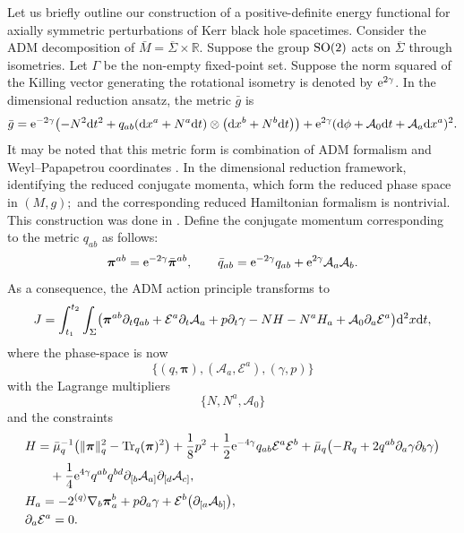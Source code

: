 \documentclass[11pt]{article}
\numberwithin{equation}{section}
\def\ptl{\partial}%
\def\mbo#1{\boldsymbol{#1}}%
\def\olin#1{\overline{#1}{}}%
\def\grad{{\nabla}}%
\newcommand{\leftexp}[2]{{\vphantom{#2}}^{#1}{#2}}
\def\halb{\frac{1}{2}}%
\numberwithin{equation}{section}
\begin{document}
Let us briefly outline our construction of a positive-definite energy functional for axially symmetric perturbations of Kerr black hole spacetimes. Consider the ADM decomposition of $\bar{M}=\olin{\Sigma} \times \mathbb{R}$. Suppose the group ${\rm SO}(2)$ acts on $\olin{\Sigma}$ through isometries. Let $\Gamma$ be the non-empty fixed-point set. Suppose the norm squared of the Killing vector generating the rotational isometry is denoted by ${\rm e}^{2\gamma}$. In the dimensional reduction ansatz, the metric $\bar{g}$ is
\begin{align}\label{KK-ADM}
\bar{g} = {\rm e}^{-2\gamma} \bigl(-N^2 {\rm d}t^2 + q_{ab} ({\rm d}x^a + N^a {\rm d}t) \otimes \bigl({\rm d}x^b + N^b {\rm d}t\bigr)\bigr) + {\rm e}^{2\gamma} ({\rm d}\phi + \mathcal{A}_0 {\rm d}t + \mathcal{A}_a {\rm d}x^a)^2.
\end{align}
It may be noted that this metric form is combination of ADM formalism and Weyl--Papapetrou coordinates \cite{Moncrief_74}.
In the dimensional reduction framework, identifying the reduced conjugate momenta, which form the reduced phase space in $(M, g);$ and the corresponding reduced Hamiltonian formalism is nontrivial. This construction was done in \cite{kaluz1}. Define the conjugate momentum corresponding to the metric $q_{ab}$ as follows:
\begin{align*}
\mbo{\pi}^{ab} = {\rm e}^{-2\gamma} \bar{\mbo{\pi}}^{ab}, \qquad \bar{q}_{ab} = {\rm e}^{-2\gamma} q_{ab} + {\rm e}^{2\gamma} \mathcal{A}_a \mathcal{A}_b.
\end{align*}
As a consequence, the ADM action principle transforms to
\begin{align*}
J = \int^{t_2}_{t_1}\int_{\Sigma} \bigl(\mbo{\pi}^{ab} \ptl_t q_{ab} + \mathcal{E}^a \ptl_t \mathcal{A}_a + p \ptl_t \gamma - N H - N^aH_a+ \mathcal{A}_0 \ptl_a \mathcal{E}^a \bigr) {\rm d}^2x{\rm d}t,
\end{align*}
where the phase-space is now
\[
 \{ (q, \mbo{\pi}), (\mathcal{A}_a, \mathcal{E}^a), (\gamma, p) \}
\]
with the Lagrange multipliers
\[
 \{ N, N^a, \mathcal{A}_0 \}
\]
and the constraints
\begin{subequations} \label{2+1constraints}
\begin{align}
&H= \bar{\mu}^{-1}_q \bigl(\Vert \mbo{\pi} \Vert^2_q - {\rm Tr}_q(\mbo{\pi})^2\bigr) + \frac{1}{8} p^2 + \halb {\rm e}^{-4\gamma}
q_{ab} \mathcal{E}^a \mathcal{E}^b + \bar{\mu}_q \bigl(-R_q + 2 q^{ab} \ptl_a \gamma \ptl_b \gamma\bigr) \notag\\
&\hphantom{H=}{}+ \frac{1}{4} {\rm e}^{4\gamma} q^{ab}q^{bd} \ptl_{[b} \mathcal{A}_{a]} \ptl_{[d} \mathcal{A}_{c]}, \\
&H_a= -2 \leftexp{(q)}{ \grad}_b \mbo{\pi}^b_a + p \ptl_a \gamma + \mathcal{E}^b \bigl(\ptl_{[a}\mathcal{A}_{b]} \bigr),\\
&\ptl_a \mathcal{E}^a =0.
\end{align}
\end{subequations}
\end{document}
